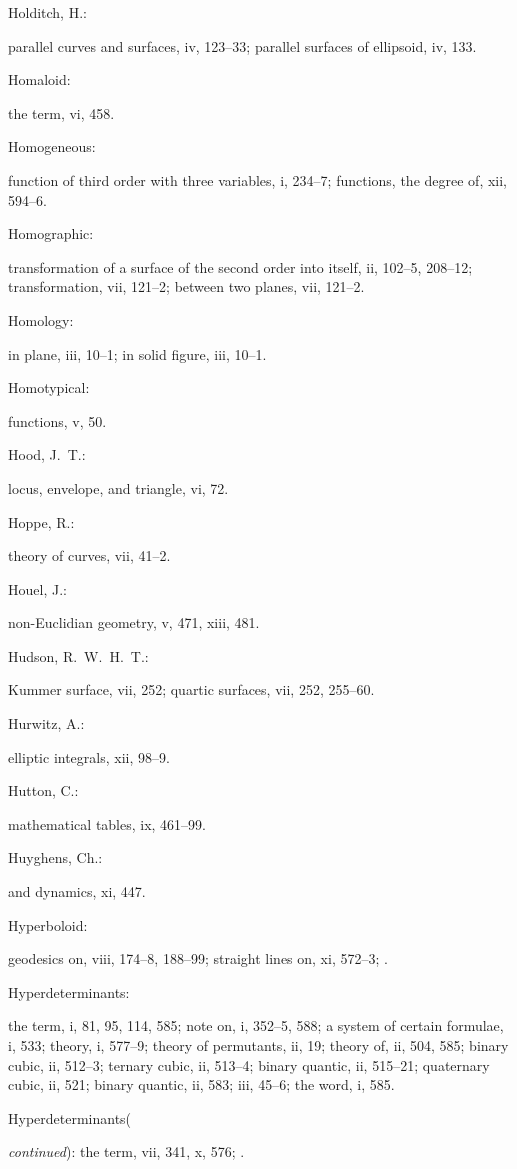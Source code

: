 \documentclass[11pt,a4paper]{book}
\providecommand{\V}[1]{#1}
\providecommand{\IndexEntry}[2]{#1\dotfill #2\par}
\begin{document}
\IndexEntry{Holditch, H.}: parallel curves and surfaces, \V{iv}, 123--33; parallel surfaces of ellipsoid, \V{iv}, 133.

\IndexEntry{Homaloid}: the term, \V{vi}, 458.

\IndexEntry{Homogeneous}: function of third order with three variables, \V{i}, 234--7; functions, the degree of, \V{xii}, 594--6.

\IndexEntry{Homographic}: transformation of a surface of the second order into itself, \V{ii}, 102--5, 208--12; transformation, \V{vii}, 121--2; between two planes, \V{vii}, 121--2.

\IndexEntry{Homology}: in plane, \V{iii}, 10--1; in solid figure, \V{iii}, 10--1.

\IndexEntry{Homotypical}: functions, \V{v}, 50.

\IndexEntry{Hood, J.\ T.}: locus, envelope, and triangle, \V{vi}, 72.

\IndexEntry{Hoppe, R.}: theory of curves, \V{vii}, 41--2.

\IndexEntry{Houel, J.}: non-Euclidian geometry, \V{v}, 471, \V{xiii}, 481.

\IndexEntry{Hudson, R.\ W.\ H.\ T.}: Kummer surface, \V{vii}, 252; quartic surfaces, \V{vii}, 252, 255--60.

\IndexEntry{Hurwitz, A.}: elliptic integrals, \V{xii}, 98--9.

\IndexEntry{Hutton, C.}: mathematical tables, \V{ix}, 461--99.

\IndexEntry{Huyghens, Ch.}: and dynamics, \V{xi}, 447.

\IndexEntry{Hyperboloid}: geodesics on, \V{viii}, 174--8, 188--99; straight lines on, \V{xi}, 572--3; .

\IndexEntry{Hyperdeterminants}: the term, \V{i}, 81, 95, 114, 585; note on, \V{i}, 352--5, 588; a system of certain formulae, \V{i}, 533; theory, \V{i}, 577--9; theory of permutants, \V{ii}, 19; theory of, \V{ii}, 504, 585; binary cubic, \V{ii}, 512--3; ternary cubic, \V{ii}, 513--4; binary quantic, \V{ii}, 515--21; quaternary cubic, \V{ii}, 521; binary quantic, \V{ii}, 583; \V{iii}, 45--6; the word, \V{i}, 585.

\newpage

\setcounter{page}{104}

\IndexEntry{Hyperdeterminants} (\textit{continued}): the term, \V{vii}, 341, \V{x}, 576; .
\end{document}
